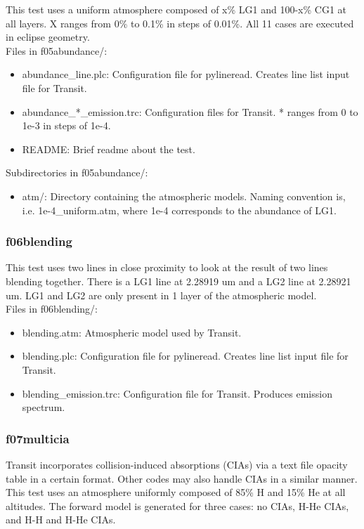 \documentclass[letterpaper, 12pt]{article}
\begin{document}
This test uses a uniform atmosphere composed of x\% LG1 and 100-x\% CG1 at 
all layers. X ranges from 0\% to 0.1\% in steps of 0.01\%. All 11 cases 
are executed in eclipse geometry.\\

Files in f05abundance/:
\begin{itemize} \itemsep0pt
  \item abundance{\_}line.plc: Configuration file for pylineread. Creates 
        line list input file for Transit.
  \item abundance{\_}*{\_}emission.trc: Configuration files for Transit. * 
        ranges from 0 to 1e-3 in steps of 1e-4.
  \item README: Brief readme about the test.
\end{itemize}

Subdirectories in f05abundance/:
\begin{itemize} \itemsep0pt
  \item atm/: Directory containing the atmospheric models. Naming convention 
        is, i.e. 1e-4{\_}uniform.atm, where 1e-4 corresponds to the abundance 
of LG1.
\end{itemize}

\subsubsection{f06blending}
\label{sec:blending}
This test uses two lines in close proximity to look at the 
result of two lines blending together. There is a LG1 line at 2.28919 um 
and a LG2 line at 2.28921 um. LG1 and LG2 are only present in 1 layer of 
the atmospheric model.\\

Files in f06blending/:
\begin{itemize} \itemsep0pt
  \item blending.atm: Atmospheric model used by Transit.
  \item blending.plc: Configuration file for pylineread. Creates 
        line list input file for Transit.
  \item blending{\_}emission.trc: Configuration file for Transit. Produces 
        emission spectrum.
\end{itemize}

\subsubsection{f07multicia}
\label{sec:multicia}
Transit incorporates collision-induced absorptions (CIAs) via a text file 
opacity table in a certain format. Other codes may also handle CIAs in a 
similar manner. This test uses an atmosphere uniformly composed of 85\% H 
and 15\% He at all altitudes. The forward model is generated for three cases: 
no CIAs, H-He CIAs, and H-H and H-He CIAs.\\
\end{document}
